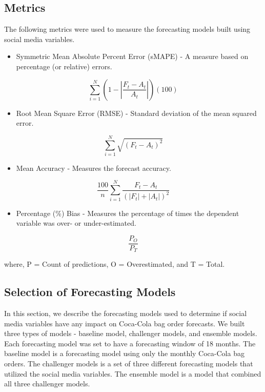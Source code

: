 \documentclass[12pt,oneside]{chicagocapstone}
\providecommand{\tightlist}{%
  \setlength{\itemsep}{0pt}\setlength{\parskip}{0pt}}
\begin{document}
\hypertarget{metrics}{%
\subsection*{Metrics}\label{metrics}}

The following metrics were used to measure the forecasting models built using social media variables.
\begin{itemize}
\tightlist
\item
  Symmetric Mean Absolute Percent Error (sMAPE) - A measure based on percentage (or relative) errors.
\end{itemize}
\noindent \[ \sum_{i=1}^N (1 - |\frac{F_t - A_t}{A_t}|)(100)\]
\begin{itemize}
\tightlist
\item
  Root Mean Square Error (RMSE) - Standard deviation of the mean squared error.
\end{itemize}
\noindent \[ \sum_{i=1}^N\sqrt{(F_t - A_t)^2} \]
\begin{itemize}
\tightlist
\item
  Mean Accuracy - Measures the forecast accuracy.
\end{itemize}
\noindent \[ \frac{100}{n}\sum_{i=1}^N\frac{F_t - A_t}{(|F_t| + |A_t|)^2}\]
\begin{itemize}
\tightlist
\item
  Percentage (\%) Bias - Measures the percentage of times the dependent variable was over- or under-estimated.
\end{itemize}
\noindent \[ \frac{ P_O}{P_T}\]

where,
P = Count of predictions,
O = Overestimated, and
T = Total.

\hypertarget{selection-of-forecasting-models}{%
\subsection*{Selection of Forecasting Models}\label{selection-of-forecasting-models}}

In this section, we describe the forecasting models used to determine if social media variables have any impact on Coca-Cola bag order forecasts. We built three types of models - baseline model, challenger models, and ensemble models. Each forecasting model was set to have a forecasting window of 18 months. The baseline model is a forecasting model using only the monthly Coca-Cola bag orders. The challenger models is a set of three different forecasting models that utilized the social media variables. The ensemble model is a model that combined all three challenger models.
\end{document}
